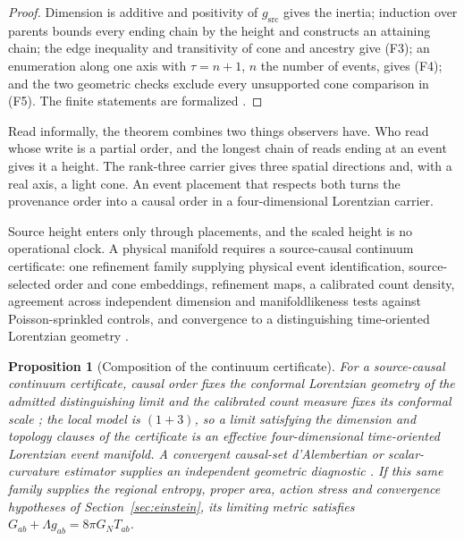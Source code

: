 \documentclass[11pt]{article}
\newtheorem{proposition}[theorem]{Proposition}
\theoremstyle{definition}
\theoremstyle{remark}
\begin{document}
\begin{proof}
Dimension is additive and positivity of $g_{\mathrm{src}}$ gives the
inertia; induction over parents bounds every ending chain by the height and
constructs an attaining chain; the edge inequality and transitivity of cone
and ancestry give (F3); an enumeration along one axis with $\tau=n+1$, $n$ the number of events, gives (F4); and the two geometric checks exclude every unsupported cone comparison
in (F5). The finite statements are formalized \cite{ophrepo,ophEinstein}.
\end{proof}

Read informally, the theorem combines two things observers have. Who read
whose write is a partial order, and the longest chain of reads ending at an
event gives it a height. The rank-three carrier gives three spatial
directions and, with a real axis, a light cone. An event placement that
respects both turns the provenance order into a causal order in a
four-dimensional Lorentzian carrier.

Source height enters only through placements, and the scaled height is
no operational clock. A physical manifold requires a source-causal
continuum certificate: one refinement family supplying
physical event identification, source-selected order and cone embeddings,
refinement maps, a calibrated count density, agreement across independent
dimension and manifoldlikeness tests against Poisson-sprinkled controls, and
convergence to a distinguishing time-oriented Lorentzian geometry
\cite{bombelli1987,surya2019,majorrideoutsurya2007}.

\begin{proposition}[Composition of the continuum certificate]
\label{thm:source-causal-continuum}
For a source-causal continuum certificate, causal order fixes the conformal
Lorentzian geometry of the admitted distinguishing limit and the calibrated
count measure fixes its conformal scale
\cite{hawkingkingmccarthy1976,malament1977}; the local model is $(1+3)$, so a
limit satisfying the dimension and topology clauses of the certificate is an effective four-dimensional time-oriented Lorentzian event manifold.
A convergent causal-set d'Alembertian or scalar-curvature estimator supplies
an independent geometric diagnostic \cite{benincasadowker2010,dowkerglaser2013}.
If this same family supplies the regional entropy, proper area, action
stress and convergence hypotheses of Section~\ref{sec:einstein}, its
limiting metric satisfies $G_{ab}+\Lambda g_{ab}=8\pi G_N T_{ab}$.
\end{proposition}
\end{document}
